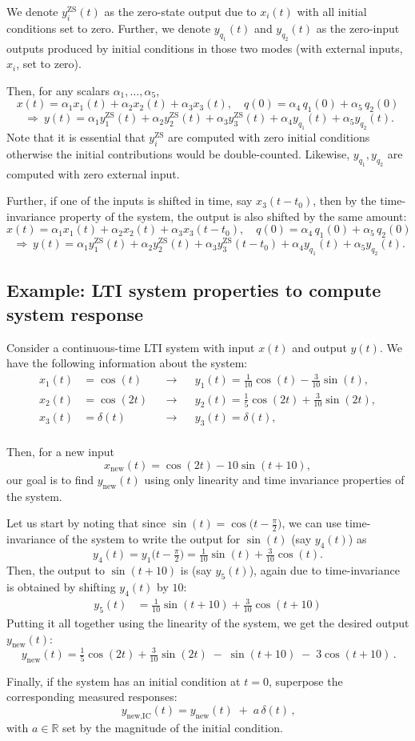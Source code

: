 \documentclass{ee102_notes}
\begin{document}
We denote $y_i^{\mathrm{ZS}}(t)$ as the zero-state output due to $x_i(t)$ with all initial conditions set to zero. Further, we denote $y_{q_1}(t)$ and $y_{q_2}(t)$ as the zero-input outputs produced by initial conditions in those two modes (with external inputs, $x_i$, set to zero).

Then, for any scalars $\alpha_1,\dots,\alpha_5$,
\[
x(t)=\alpha_1 x_1(t)+\alpha_2 x_2(t)+\alpha_3 x_3(t),\quad
q(0)=\alpha_4\,q_1(0)+\alpha_5\,q_2(0)
\]
\[
~\Longrightarrow~
y(t)=\alpha_1 y_1^{\mathrm{ZS}}(t)+\alpha_2 y_2^{\mathrm{ZS}}(t)+\alpha_3 y_3^{\mathrm{ZS}}(t)
      +\alpha_4 y_{q_1}(t)+\alpha_5 y_{q_2}(t).
\]
Note that it is essential that $y_i^{\mathrm{ZS}}$ are computed with zero initial conditions otherwise the initial contributions would be double-counted. Likewise, $y_{q_1},y_{q_2}$ are computed with zero external input.

Further, if one of the inputs is shifted in time, say $x_3(t-t_0)$, then by the time-invariance property of the system, the output is also shifted by the same amount:
\[
x(t)=\alpha_1 x_1(t)+\alpha_2 x_2(t)+\alpha_3 x_3(t-t_0),\quad
q(0)=\alpha_4\,q_1(0)+\alpha_5\,q_2(0)
\]
\[
~\Longrightarrow~
y(t)=\alpha_1 y_1^{\mathrm{ZS}}(t)+\alpha_2 y_2^{\mathrm{ZS}}(t)+\alpha_3 y_3^{\mathrm{ZS}}(t-t_0)
      +\alpha_4 y_{q_1}(t)+\alpha_5 y_{q_2}(t).
\]
\subsection{Example: LTI system properties to compute system response}

Consider a continuous-time LTI system with input $x(t)$ and output $y(t)$. We have the following information about the system:
\[
\begin{aligned}
x_1(t)&=\cos(t) 
&&\longrightarrow&&
y_1(t)=\tfrac{1}{10}\cos(t)-\tfrac{3}{10}\sin(t),\\[2pt]
x_2(t)&=\cos(2t) 
&&\longrightarrow&&
y_2(t)=\tfrac{1}{5}\cos(2t)+\tfrac{3}{10}\sin(2t),\\[2pt]
x_3(t)&=\delta(t)
&&\longrightarrow&&
y_3(t)=\delta(t),\\[2pt]
\end{aligned}
\]

Then, for a new input
\[
x_{\text{new}}(t)=\cos(2t)-10\sin(t+10),
\]
our goal is to find $y_{\text{new}}(t)$ using only linearity and time invariance properties of the system. 

Let us start by noting that since $\sin(t)=\cos\!\big(t-\tfrac{\pi}{2}\big)$, we can use time-invariance of the system to write the output for $\sin(t)$ (say $y_4(t)$) as
\[
y_4(t)=y_1\!\Big(t-\tfrac{\pi}{2}\Big)
=\tfrac{1}{10}\sin(t)+\tfrac{3}{10}\cos(t).
\]
Then, the output to $\sin(t+10)$ is (say $y_5(t)$), again due to time-invariance is obtained by shifting $y_4(t)$ by $10$:
\[
\begin{aligned}
y_5(t)
&=\tfrac{1}{10}\sin(t+10)+\tfrac{3}{10}\cos(t+10)
\end{aligned}
\]
Putting it all together using the linearity of the system, we get the desired output $y_{\text{new}}(t)$:
\[\,y_{\text{new}}(t)
=\tfrac{1}{5}\cos(2t)+\tfrac{3}{10}\sin(2t)\;-\;\sin(t+10)\;-\;3\cos(t+10)\,.
\]

Finally, if the system has an initial condition at $t=0$, superpose the corresponding measured responses:
\[
\,y_{\text{new,IC}}(t)=y_{\text{new}}(t)\;+\;a\,\delta(t)\,,
\]
with $a \in\mathbb{R}$ set by the magnitude of the initial condition.
\end{document}
